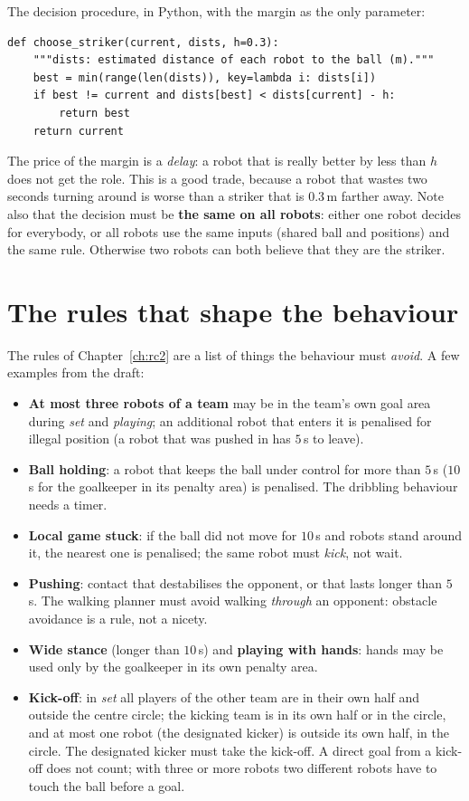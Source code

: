 The decision procedure, in Python, with the margin as the only parameter:
\begin{verbatim}
def choose_striker(current, dists, h=0.3):
    """dists: estimated distance of each robot to the ball (m)."""
    best = min(range(len(dists)), key=lambda i: dists[i])
    if best != current and dists[best] < dists[current] - h:
        return best
    return current
\end{verbatim}
The price of the margin is a \emph{delay}: a robot that is really better by less than $h$ does not get the role. This is a good trade, because a robot that wastes two seconds turning around is worse than a striker that is $0.3$\,m farther away. Note also that the decision must be \textbf{the same on all robots}: either one robot decides for everybody, or all robots use the same inputs (shared ball and positions) and the same rule. Otherwise two robots can both believe that they are the striker.

\section*{The rules that shape the behaviour}
The rules of Chapter~\ref{ch:rc2} are a list of things the behaviour must \emph{avoid}. A few examples from the draft:
\begin{itemize}[nosep]
 \item \textbf{At most three robots of a team} may be in the team's own goal area during \emph{set} and \emph{playing}; an additional robot that enters it is penalised for illegal position (a robot that was pushed in has $5$\,s to leave).
 \item \textbf{Ball holding}: a robot that keeps the ball under control for more than $5$\,s ($10$\,s for the goalkeeper in its penalty area) is penalised. The dribbling behaviour needs a timer.
 \item \textbf{Local game stuck}: if the ball did not move for $10$\,s and robots stand around it, the nearest one is penalised; the same robot must \emph{kick}, not wait.
 \item \textbf{Pushing}: contact that destabilises the opponent, or that lasts longer than $5$\,s. The walking planner must avoid walking \emph{through} an opponent: obstacle avoidance is a rule, not a nicety.
 \item \textbf{Wide stance} (longer than $10$\,s) and \textbf{playing with hands}: hands may be used only by the goalkeeper in its own penalty area.
 \item \textbf{Kick-off}: in \emph{set} all players of the other team are in their own half and outside the centre circle; the kicking team is in its own half or in the circle, and at most one robot (the designated kicker) is outside its own half, in the circle. The designated kicker must take the kick-off. A direct goal from a kick-off does not count; with three or more robots two different robots have to touch the ball before a goal.
\end{itemize}

